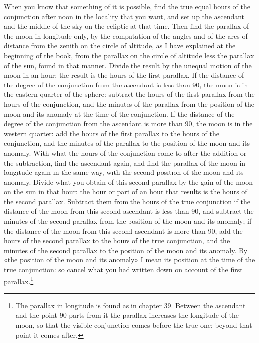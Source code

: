 \documentclass[11pt]{article}
\newcommand{\ArPage}[1]{\marginpar{\footnotesize\color{gray}Ar.\,p.\,#1}}
\begin{document}
\par \ArPage{158}When you know that something of it is possible, find the true equal hours of the conjunction after noon in the locality that you want, and set up the ascendant and the middle of the sky on the ecliptic at that time. Then find the parallax of the moon in longitude only, by the computation of the angles and of the arcs of distance from the zenith on the circle of altitude, as I have explained at the beginning of the book, from the parallax on the circle of altitude less the parallax of the sun, found in that manner. Divide the result by the unequal motion of the moon in an hour: the result is the hours of the first parallax. If the distance of the degree of the conjunction from the ascendant is less than 90, the moon is in the eastern quarter of the sphere: subtract the hours of the first parallax from the hours of the conjunction, and the minutes of the parallax from the position of the moon and its anomaly at the time of the conjunction. If the distance of the degree of the conjunction from the ascendant is more than 90, the moon is in the western quarter: add the hours of the first parallax to the hours of the conjunction, and the minutes of the parallax to the position of the moon and its anomaly. With what the hours of the conjunction come to after the addition or the subtraction, find the ascendant again, and find the parallax of the moon in longitude again in the same way, with the second position of the moon and its anomaly. Divide what you obtain of this second parallax by the gain of the moon on the sun in that hour: the hour or part of an hour that results is the hours of the second parallax. Subtract them from the hours of the true conjunction if the distance of the moon from this second ascendant is less than 90, and subtract the minutes of the second parallax from the position of the moon and its anomaly; if the distance of the moon from this second ascendant is more than 90, add the hours of the second parallax to the hours of the true conjunction, and the minutes of the second parallax to the position of the moon and its anomaly. By «the position of the moon and its anomaly» I mean its position at the time of the true conjunction: so cancel what you had written down on account of the first parallax.\footnote{The parallax in longitude is found as in chapter 39. Between the ascendant and the point 90 parts from it the parallax increases the longitude of the moon, so that the visible conjunction comes before the true one; beyond that point it comes after.}\par
\end{document}
